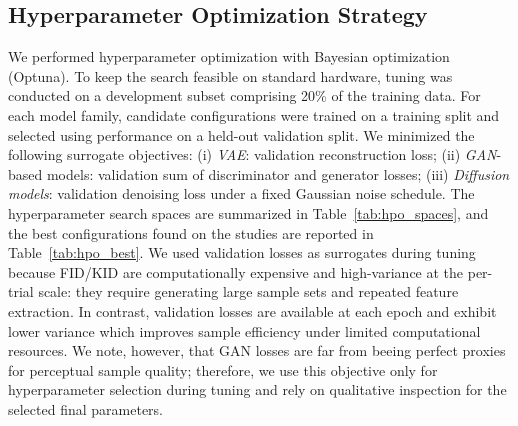 \documentclass[runningheads]{llncs}
\begin{document}
\subsection{Hyperparameter Optimization Strategy}
We performed hyperparameter optimization with Bayesian optimization (Optuna). To keep the search feasible on standard hardware, 
tuning was conducted on a development subset comprising 20\% of the training data. For each model family, candidate configurations 
were trained on a training split and selected using performance on a held-out validation split. We minimized the following 
surrogate objectives: (i) \textit{VAE}: validation reconstruction loss; (ii) \textit{GAN}-based models: validation sum of discriminator 
and generator losses; (iii) \textit{Diffusion models}: validation denoising loss under a fixed Gaussian noise schedule.
The hyperparameter search spaces are summarized in Table~\ref{tab:hpo_spaces}, and the best configurations found on the studies are 
reported in Table~\ref{tab:hpo_best}. We used validation losses as surrogates during tuning because FID/KID are computationally expensive 
and high-variance at the per-trial scale: they require generating large sample sets and repeated feature extraction. In contrast, validation losses are 
available at each epoch and exhibit lower variance which improves sample efficiency under limited computational resources. We note, however, that GAN losses are far from beeing perfect proxies 
for perceptual sample quality; therefore, we use this objective only for hyperparameter selection during tuning and rely on qualitative inspection 
for the selected final parameters.
\end{document}
